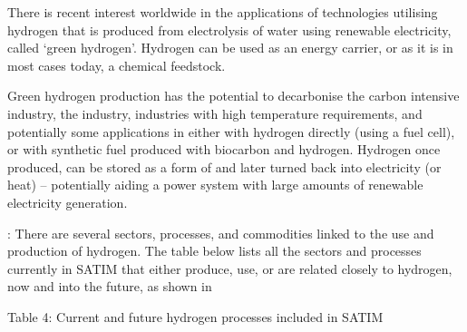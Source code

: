 \documentclass[letterpaper,10pt,english]{jupyterBook}
\begin{document}
\sphinxAtStartPar
{}

\sphinxAtStartPar
There is recent interest worldwide in the applications of technologies utilising hydrogen that is produced from electrolysis of water using renewable electricity, called ‘green hydrogen’. Hydrogen can be used as an energy carrier, or as it is in most cases today, a chemical feedstock.

\sphinxAtStartPar
Green hydrogen production has the potential to decarbonise the carbon intensive  industry, the  industry, industries with high temperature requirements, and potentially some applications in  either with hydrogen directly (using a fuel cell), or with synthetic fuel produced with biocarbon and hydrogen. Hydrogen once produced, can be stored as a form of  and later turned back into electricity (or heat) – potentially aiding a power system with large amounts of renewable electricity generation.

\sphinxAtStartPar
{}: There are several sectors, processes, and commodities linked to the use and production of hydrogen. The table below lists all the sectors and processes currently in SATIM that either produce, use, or are related closely to hydrogen, now and into the future, as shown in

\sphinxAtStartPar
Table 4: Current and future hydrogen processes included in SATIM
\end{document}
